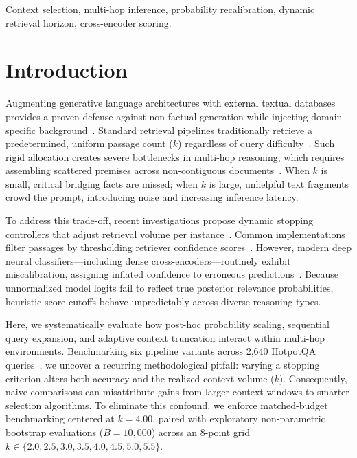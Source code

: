 \documentclass{article}
\begin{document}
\begin{IEEEkeywords}
Context selection, multi-hop inference, probability recalibration, dynamic retrieval horizon, cross-encoder scoring.
\end{IEEEkeywords}

\section{Introduction}
\label{sec:intro}
Augmenting generative language architectures with external textual databases provides a proven defense against non-factual generation while injecting domain-specific background~\cite{collini2025carag,asai2024selfrag}. Standard retrieval pipelines traditionally retrieve a predetermined, uniform passage count ($k$) regardless of query difficulty~\cite{kratzwald2018adaptive,jeong2024adaptiverag}. Such rigid allocation creates severe bottlenecks in multi-hop reasoning, which requires assembling scattered premises across non-contiguous documents~\cite{yang2018hotpotqa}. When $k$ is small, critical bridging facts are missed; when $k$ is large, unhelpful text fragments crowd the prompt, introducing noise and increasing inference latency.

To address this trade-off, recent investigations propose dynamic stopping controllers that adjust retrieval volume per instance~\cite{kratzwald2018adaptive,jeong2024adaptiverag,wang2024targ,liu2024ctrla}. Common implementations filter passages by thresholding retriever confidence scores~\cite{collini2025carag}. However, modern deep neural classifiers—including dense cross-encoders—routinely exhibit miscalibration, assigning inflated confidence to erroneous predictions~\cite{guo2017calibration}. Because unnormalized model logits fail to reflect true posterior relevance probabilities, heuristic score cutoffs behave unpredictably across diverse reasoning types.

Here, we systematically evaluate how post-hoc probability scaling, sequential query expansion, and adaptive context truncation interact within multi-hop environments. Benchmarking six pipeline variants across 2,640 HotpotQA queries~\cite{yang2018hotpotqa}, we uncover a recurring methodological pitfall: varying a stopping criterion alters both accuracy and the realized context volume ($k$). Consequently, naive comparisons can misattribute gains from larger context windows to smarter selection algorithms. To eliminate this confound, we enforce matched-budget benchmarking centered at $k = 4.00$, paired with exploratory non-parametric bootstrap evaluations ($B=10{,}000$) across an 8-point grid $k \in \{2.0, 2.5, 3.0, 3.5, 4.0, 4.5, 5.0, 5.5\}$.
\end{document}
